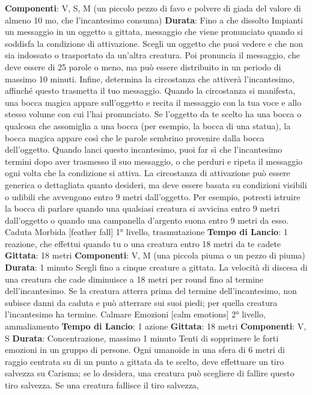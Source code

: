 \begin{multicols}{2}
\textbf{Componenti}: V, S, M (un piccolo pezzo di favo e
polvere di giada del valore di almeno 10 mo, che
l’incantesimo consuma)
\textbf{Durata}: Fino a che dissolto
Impianti un messaggio in un oggetto a gittata,
messaggio che viene pronunciato quando si soddisfa la
condizione di attivazione. Scegli un oggetto che puoi
vedere e che non sia indossato o trasportato da un’altra
creatura. Poi pronuncia il messaggio, che deve essere
di 25 parole o meno, ma può essere distribuito in un
periodo di massimo 10 minuti. Infine, determina la
circostanza che attiverà l’incantesimo, affinché questo
trasmetta il tuo messaggio.
Quando la circostanza si manifesta, una bocca magica
appare sull’oggetto e recita il messaggio con la tua
voce e allo stesso volume con cui l’hai pronunciato. Se
l’oggetto da te scelto ha una bocca o qualcosa che
assomiglia a una bocca (per esempio, la bocca di una
statua), la bocca magica appare così che le parole
sembrino provenire dalla bocca dell’oggetto. Quando
lanci questo incantesimo, puoi far sì che l’incantesimo
termini dopo aver trasmesso il suo messaggio, o che
perduri e ripeta il messaggio ogni volta che la
condizione si attiva.
La circostanza di attivazione può essere generica o
dettagliata quanto desideri, ma deve essere basata su
condizioni visibili o udibili che avvengono entro 9 metri
dall’oggetto. Per esempio, potresti istruire la bocca di
parlare quando una qualsiasi creatura si avvicina entro
9 metri dall’oggetto o quando una campanella d’argento
suona entro 9 metri da esso.
Caduta Morbida
[feather fall]
1° livello, trasmutazione
\textbf{Tempo di Lancio}: 1 reazione, che effettui quando tu o
una creatura entro 18 metri da te cadete
\textbf{Gittata}: 18 metri
\textbf{Componenti}: V, M (una piccola piuma o un pezzo di
piuma)
\textbf{Durata}: 1 minuto
Scegli fino a cinque creature a gittata. La velocità di
discesa di una creatura che cade diminuisce a 18 metri
per round fino al termine dell’incantesimo. Se la
creatura atterra prima del termine dell’incantesimo, non
subisce danni da caduta e può atterrare sui suoi piedi;
per quella creatura l’incantesimo ha termine.
Calmare Emozioni
[calm emotions]
2° livello, ammaliamento
\textbf{Tempo di Lancio}: 1 azione
\textbf{Gittata}: 18 metri
\textbf{Componenti}: V, S
\textbf{Durata}: Concentrazione, massimo 1 minuto
Tenti di sopprimere le forti emozioni in un gruppo di
persone. Ogni umanoide in una sfera di 6 metri di
raggio centrata su di un punto a gittata da te scelto,
deve effettuare un tiro salvezza su Carisma; se lo
desidera, una creatura può scegliere di fallire questo
tiro salvezza. Se una creatura fallisce il tiro salvezza,

\end{multicols}
